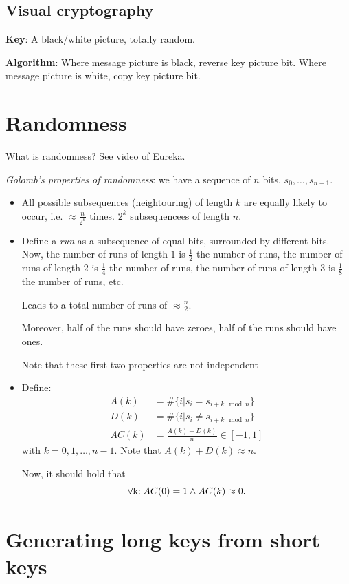 \documentclass[language=english,number=]{homework}
\begin{document}
\subsection{Visual cryptography}

\textbf{Key}: A black/white picture, totally random.

\textbf{Algorithm}: Where message picture is black, reverse key picture bit.
Where message picture is white, copy key picture bit.

\newpage
\section{Randomness}

What is randomness?
See video of Eureka.

\textit{Golomb's properties of randomness}: we have a sequence of $n$ bits, $s_0, \dots, s_{n-1}$.
\begin{itemize}
\item All possible subsequences (neightouring) of length $k$ are equally likely to occur, i.e. $\approx \frac{n}{2^k}$ times.
$2^k$ subsequencees of length $n$.
\item Define a \textit{run} as a subsequence of equal bits, surrounded by different bits.
Now, the number of runs of length $1$ is $\frac{1}{2}$ the number of runs, the number of runs of length $2$ is $\frac{1}{4}$ the number of runs, the number of runs of length $3$ is $\frac{1}{8}$ the number of runs, etc.

Leads to a total number of runs of $\approx \frac{n}{2}$.

Moreover, half of the runs should have zeroes, half of the runs should have ones.

Note that these first two properties are not independent
\item Define:
\begin{align*}
A(k) &= \# \{i | s_i = s_{i + k \mod n} \} \\
D(k) &= \# \{i | s_i \ne s_{i + k \mod n} \} \\
AC(k) &= \frac{A(k) - D(k)}{n} \in [-1,1]
\end{align*}
with $k = 0, 1, \dots, n-1$.
Note that $A(k) + D(k) \approx n$.

Now, it should hold that
\[
\forall $k$ : AC(0) = 1 \wedge AC(k) \approx 0.
\]
\end{itemize}

\newpage
\section{Generating long keys from short keys}
\end{document}
